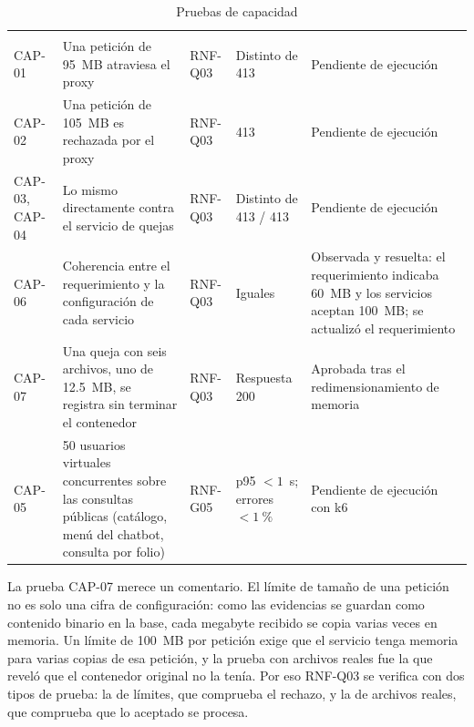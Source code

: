 	\small
	\renewcommand{\arraystretch}{1.2}
	\setlength{\tabcolsep}{4pt}
	\begin{longtable}{|p{1.2cm}|L{5.6cm}|L{2.2cm}|L{2.6cm}|L{2.9cm}|}
		\caption{Pruebas de capacidad}
		\label{tab:pruebas_capacidad} \\
		\hline
		 &  &  &
		 &  \\
		\hline
		\endfirsthead
		\hline
		 &  &  &
		 &  \\
		\hline
		\endhead
		CAP-01 & Una petición de 95~MB atraviesa el proxy & RNF-Q03 & Distinto de 413 & Pendiente de
		ejecución \\ \hline
		CAP-02 & Una petición de 105~MB es rechazada por el proxy & RNF-Q03 & 413 & Pendiente de ejecución \\ \hline
		CAP-03, CAP-04 & Lo mismo directamente contra el servicio de quejas & RNF-Q03 & Distinto de 413 / 413
		& Pendiente de ejecución \\ \hline
		CAP-06 & Coherencia entre el requerimiento y la configuración de cada servicio & RNF-Q03 & Iguales
		& Observada y resuelta: el requerimiento indicaba 60~MB y los servicios aceptan 100~MB; se actualizó
		el requerimiento \\ \hline
		CAP-07 & Una queja con seis archivos, uno de 12.5~MB, se registra sin terminar el contenedor &
		RNF-Q03 & Respuesta 200 & Aprobada tras el redimensionamiento de memoria \\ \hline
		CAP-05 & 50 usuarios virtuales concurrentes sobre las consultas públicas (catálogo, menú del
		chatbot, consulta por folio) & RNF-G05 & p95 $< 1$~s; errores $< 1~\%$ & Pendiente de ejecución
		con k6 \\ \hline
	\end{longtable}
	\normalsize

	La prueba CAP-07 merece un comentario. El límite de tamaño de una petición no es solo una cifra de
	configuración: como las evidencias se guardan como contenido binario en la base, cada megabyte
	recibido se copia varias veces en memoria. Un límite de 100~MB por petición exige que el servicio
	tenga memoria para varias copias de esa petición, y la prueba con archivos reales fue la que reveló
	que el contenedor original no la tenía. Por eso RNF-Q03 se verifica con dos tipos de prueba: la de
	límites, que comprueba el rechazo, y la de archivos reales, que comprueba que lo aceptado se procesa.

